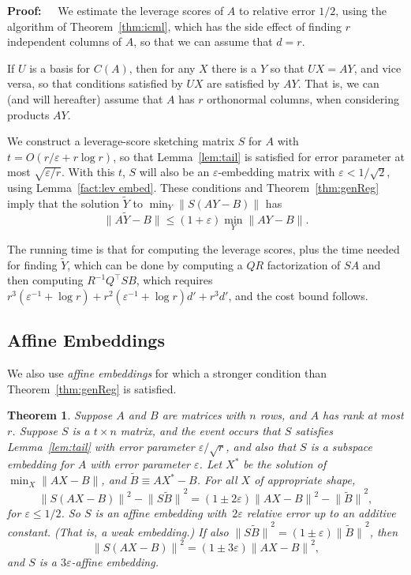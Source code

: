 \documentclass{sig-alternate}
\newcommand{\norm}[1]{{\| #1 \|}}
\newcommand{\ZZ}{S}
\newcommand{\eps}{\varepsilon}
\newtheorem{theorem}{Theorem}
\def\FullBox{\hbox{\vrule width 8pt height 8pt depth 0pt}}
\def\qed{\ifmmode\qquad\FullBox\else{\unskip\nobreak\hfil
\penalty50\hskip1em\null\nobreak\hfil\FullBox
\parfillskip=0pt\finalhyphendemerits=0\endgraf}\fi}
\newenvironment{proof}{\begin{trivlist} \item {\bf Proof:~~}}
  {\qed\end{trivlist}}
\begin{document}
\begin{proof}
We estimate the leverage scores of $A$ to relative error $1/2$,
using the algorithm of
Theorem~\ref{thm:icml}, which has the side effect of finding
$r$ independent columns of $A$, so that we can assume that $d=r$.

If $U$ is a basis for $C(A)$, then
for any $X$ there is a $Y$ so that $UX=AY$,
and vice versa, so that conditions satisfied by $UX$ are satisfied
by $AY$. That is, we can (and will hereafter)
assume that $A$ has $r$ orthonormal columns, when
considering products $AY$.

We construct a leverage-score sketching matrix $S$ for $A$
with $t=O(r/\eps + r\log r)$, so that Lemma~\ref{lem:tail}
is satisfied for error parameter at most $\sqrt{\eps/r}$. With this $t$,
$S$ will also be an $\eps$-embedding matrix with
$\eps<1/\sqrt{2}$, using Lemma~\ref{fact:lev embed}.
These conditions and Theorem~\ref{thm:genReg} imply that
the solution $\tilde Y$ to $\min_Y \norm{S(AY-B)}$
has
\[
\norm{A\tilde Y - B}\le (1+\eps)\min_Y \norm{AY-B}.
\]

The running time is that for computing the leverage scores, plus
the time needed for finding $\tilde Y$, which
can be done by computing a $QR$ factorization
of $SA$ and then computing $R^{-1}Q^\top SB$,
which requires $r^3(\eps^{-1} + \log r) + r^2(\eps^{-1}+\log r) d' + r^3d'$,
and the cost bound follows.
\end{proof}

\subsection{Affine Embeddings}\label{subsec:genAff}

We also use \emph{affine embeddings}  for which a stronger condition
than Theorem~\ref{thm:genReg} is satisfied.

\begin{theorem}\label{thm:genAff}
Suppose $A$ and $B$ are matrices with $n$ rows,
and $A$ has rank at most $r$.
Suppose
$\ZZ $ is a $t \times n$ matrix,
and the event occurs that $\ZZ $ satisfies Lemma~\ref{lem:tail} with error
parameter $\eps/\sqrt{r}$, and also that
$\ZZ $ is a subspace embedding for $A$ with 
error parameter $\eps$.
Let $X^*$ be the solution of $\min_X\norm{AX-B}$, and $\tilde B \equiv AX^*-B$.
For all $X$ of appropriate shape,
\[
\norm{\ZZ(AX-B)}^2 - \norm{\ZZ\tilde B}^2  = (1\pm 2\eps) \norm{AX-B}^2 - \norm{\tilde B}^2,
\]
for $\eps\le 1/2$.
So $S$ is an affine embedding with~$2\eps$ relative error up to an additive constant.
(That is, a \emph{weak} embedding.)
If also $\norm{S\tilde B}^2 = (1\pm\eps)\norm{\tilde B}^2$, then
\begin{equation}\label{eq:aff embed}
\norm{\ZZ(AX-B)}^2 = (1\pm 3\eps) \norm{AX-B}^2,
\end{equation}
and $\ZZ$ is a $3\eps$-affine embedding.
\end{theorem}
\end{document}
